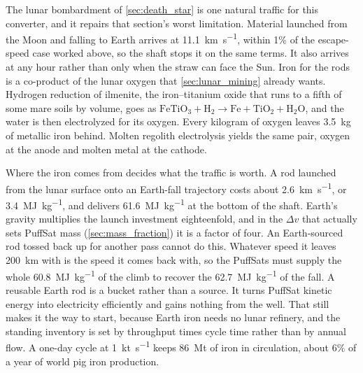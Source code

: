 \documentclass{article}
\newcommand{\deltav}{\Delta v}
\begin{document}
The lunar bombardment of \autoref{sec:death_star} is one natural traffic for this converter, and it repairs that section's worst limitation.  Material launched from the Moon and falling to Earth arrives at \SI{11.1}{\kilo\meter\per\second}, within 1\% of the escape-speed case worked above, so the shaft stops it on the same terms.  It also arrives at any hour rather than only when the straw can face the Sun.  Iron for the rods is a co-product of the lunar oxygen that \autoref{sec:lunar_mining} already wants.  Hydrogen reduction of ilmenite, the iron--titanium oxide that runs to a fifth of some mare soils by volume, goes as $\mathrm{FeTiO_3 + H_2 \rightarrow Fe + TiO_2 + H_2O}$, and the water is then electrolyzed for its oxygen.  Every kilogram of oxygen leaves \SI{3.5}{\kilo\gram} of metallic iron behind.  Molten regolith electrolysis yields the same pair, oxygen at the anode and molten metal at the cathode.

Where the iron comes from decides what the traffic is worth.  A rod launched from the lunar surface onto an Earth-fall trajectory costs about \SI{2.6}{\kilo\meter\per\second}, or \SI{3.4}{\mega\joule\per\kilo\gram}, and delivers \SI{61.6}{\mega\joule\per\kilo\gram} at the bottom of the shaft.  Earth's gravity multiplies the launch investment eighteenfold, and in the $\deltav$ that actually sets PuffSat mass (\autoref{sec:mass_fraction}) it is a factor of four.  An Earth-sourced rod tossed back up for another pass cannot do this.  Whatever speed it leaves \SI{200}{\kilo\meter} with is the speed it comes back with, so the PuffSats must supply the whole \SI{60.8}{\mega\joule\per\kilo\gram} of the climb to recover the \SI{62.7}{\mega\joule\per\kilo\gram} of the fall.  A reusable Earth rod is a bucket rather than a source.  It turns PuffSat kinetic energy into electricity efficiently and gains nothing from the well.  That still makes it the way to start, because Earth iron needs no lunar refinery, and the standing inventory is set by throughput times cycle time rather than by annual flow.  A one-day cycle at \SI{1}{\kilo\tonne\per\second} keeps \SI{86}{\mega\tonne} of iron in circulation, about 6\% of a year of world pig iron production.
\end{document}
